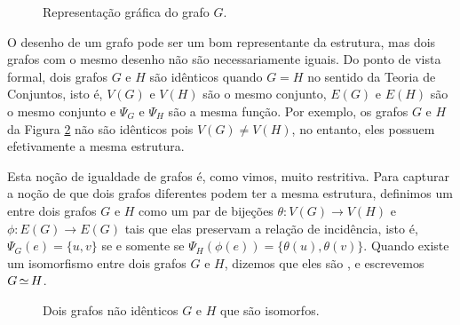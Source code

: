\begin{figure}[h!]
\centering
{}
\caption{Representação gráfica do grafo $G$.}
\label{fig:grafo}
\end{figure}

O desenho de um grafo pode ser um bom representante da estrutura, mas dois grafos com o mesmo desenho não são necessariamente iguais. Do ponto de vista formal, dois grafos $G$ e $H$ são idênticos quando $G = H$ no sentido da Teoria de Conjuntos, isto é, $V(G)$ e $V(H)$ são o mesmo conjunto, $E(G)$ e $E(H)$ são o mesmo conjunto e $\Psi_G$ e $\Psi_H$ são a mesma função. Por exemplo, os grafos $G$ e $H$ da Figura \ref{fig:iso} não são idênticos pois $V(G) \neq V(H)$, no entanto, eles possuem efetivamente a mesma estrutura.

Esta noção de igualdade de grafos é, como vimos, muito restritiva. Para capturar a noção de que dois grafos diferentes podem ter a mesma estrutura, definimos um  entre dois grafos $G$ e $H$ como um par de bijeções $\theta : V(G) \to V(H)$ e $\phi : E(G) \to E(G)$ tais que elas preservam a relação de incidência, isto é, $\Psi_G(e) = \{u,v\}$ se e somente se $\Psi_H(\phi(e)) = \{\theta(u),\theta(v)\}$. Quando existe um isomorfismo entre dois grafos $G$ e $H$, dizemos que eles são , e escrevemos $G \operatorname{\simeq} H$.

\begin{figure}[h!]
\centering
{}
\caption{Dois grafos não idênticos $G$ e $H$ que são isomorfos.}
\label{fig:iso}
\end{figure}

